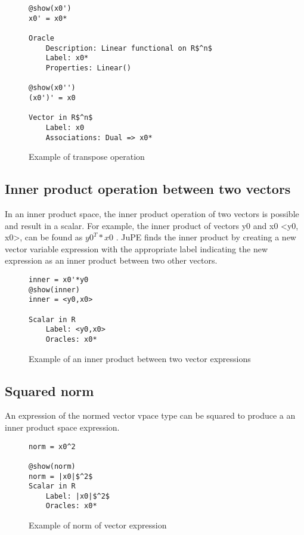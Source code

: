 \begin{figure}[!h]
	\begin{lstlisting}[mathescape]
@show(x0')
x0' = x0*

Oracle
	Description: Linear functional on R$^n$
	Label: x0*
	Properties: Linear()

@show(x0'')
(x0')' = x0

Vector in R$^n$
	Label: x0
	Associations: Dual => x0*
	\end{lstlisting}
	\caption{Example of transpose operation}
	\label{ex_transpose}
\end{figure}

\subsection*{Inner product operation between two vectors}
In an inner product space, the inner product operation of two vectors is possible and result in a scalar. For example, the inner product of vectors y0 and x0 <y0, x0>,  can be found as $y0^T * x0$ . JuPE finds the inner product by creating a new vector variable expression with the appropriate label indicating the new expression as an inner product between two other vectors.
\begin{figure}[!h]
	\begin{lstlisting}[mathescape]
inner = x0'*y0
@show(inner)
inner = <y0,x0>

Scalar in R
	Label: <y0,x0>
	Oracles: x0*

	\end{lstlisting}
	\caption{Example of an inner product between two vector expressions}
	\label{ex_inner}
\end{figure}

\subsection*{Squared norm}
An expression of the normed vector vpace type can be squared to produce a an inner product space expression.
\begin{figure}[!h]
	\begin{lstlisting}[mathescape]
norm = x0^2

@show(norm)
norm = |x0|$^2$
Scalar in R
	Label: |x0|$^2$
	Oracles: x0*
\end{lstlisting}
\caption{Example of norm of vector expression}
\label{ex_norm}
\end{figure}

